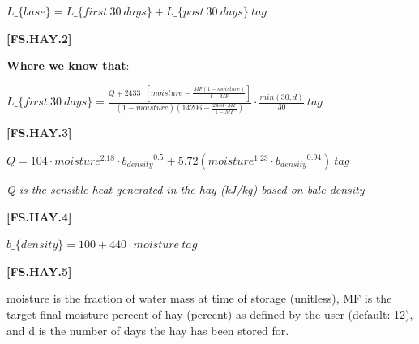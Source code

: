 \begin{refsection}
    \begin{center}
        \(L\_\{base\}  =  L\_\{first\ 30\ days\} + L\_\{post\ 30\ days\}\ tag\)
    \end{center}
        \vspace{0.5cm}
    
            {\raggedleft \textbf{[FS.HAY.2]}\par}
            \vspace{0.5cm}

\textbf{Where we know that}: \\ 
    \begin{center}
        \(L\_\{first\ 30\ days\} =  \frac{Q + 2433 \cdot [moisture - \frac{MF(1 - moisture)}{1 - MF}]}{(1 - moisture)(14206 - \frac{2433 \cdot MF}{1 - MF})} \cdot \frac{min(30, d)}{30} \ tag\)
    \end{center}
        \vspace{0.5cm}
    
            {\raggedleft \textbf{[FS.HAY.3]}\par}
            \vspace{0.5cm}

    \begin{center}
        \(Q =  104 \cdot moisture^{2.18} \cdot {b_{density}}^{0.5} + 5.72(moisture^{1.23} \cdot {b_{density}}^{0.94})\ tag\)
    \end{center}
        \vspace{0.25cm}
        \textit{Q is the sensible heat generated in the hay (kJ/kg) based on bale density}
        \vspace{0.5cm}
    
            {\raggedleft \textbf{[FS.HAY.4]}\par}
            \vspace{0.5cm}

    \begin{center}
        \(b\_\{density\} =  100 + 440 \cdot moisture\ tag\)
    \end{center}
        \vspace{0.5cm}
    
            {\raggedleft \textbf{[FS.HAY.5]}\par}
            \vspace{0.5cm}

moisture is the fraction of water mass at time of storage (unitless), MF is the target final moisture percent of hay (percent) as defined by the user (default: 12), and d is the number of days the hay has been stored for. 
\vspace{0.2cm}


\end{refsection}
